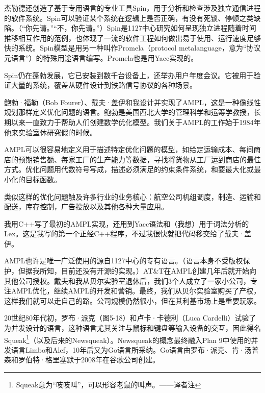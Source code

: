 \documentclass[a4paper,12pt,UTF8,twoside]{ctexbook}
\begin{document}
杰勒德还创造了基于专用语言的专业工具Spin，用于分析和检查涉及独立通信进程的软件系统。Spin可以验证某个系统在逻辑上是否正确，有没有死锁、停顿之类缺陷。（“你先请。”“不，你先请。”）Spin是1127中心研究如何呈现独立进程随着时间推移相互作用的范例，也体现了一流的软件工程如何做出易于使用、运行速度足够快的系统。Spin模型是用另一种叫作Promela（protocol metalanguage，意为“协议元语言”）的特殊用途语言编写。Promela也是用Yacc实现的。

Spin仍在蓬勃发展，它已安装到数千台设备上，还举办用户年度会议。它被用于验证大量的系统，覆盖从硬件设计到铁路信号协议的各种场景。

鲍勃·福勒（Bob Fourer）、戴夫·盖伊和我设计并实现了AMPL，这是一种像线性规划那样定义优化问题的语言。鲍勃是美国西北大学的管理科学和运筹学教授，长期以来一直致力于帮助人们创建数学优化模型。我们关于AMPL的工作始于1984年他来实验室休研究假的时候。

AMPL可以很容易地定义用于描述特定优化问题的模型，如给定运输成本、每间商店的预期销售额、每家工厂的生产能力等数据，寻找将货物从工厂运到商店的最佳方式。优化问题用代数符号写成，描述必须满足的约束条件系统，和要最大化或最小化的目标函数。

类似这样的优化问题触及许多行业的业务核心：航空公司机组调度，制造、运输和配送，库存控制，广告投放以及其他各种大量应用。

我用C++写了最初的AMPL实现，还用到Yacc语法和（我想）用于词法分析的Lex。这是我写的第一个正经C++程序，不过我很快就把代码移交给了戴夫·盖伊。

AMPL也许是唯一广泛使用的源自1127中心的专有语言。（语言本身不受版权保护，但据我所知，目前还没有开源的实现。）AT\&T在AMPL创建几年后就开始向其他公司授权。戴夫和我从贝尔实验室退休后，我们3个人成立了一家小公司，专注AMPL优化，继续AMPL的开发和营销。最终，我们从贝尔实验室购买了产权，这样我们就可以走自己的路。公司规模仍然很小，但在其利基市场上是重要玩家。

20世纪80年代初，罗布·派克（图5-18）和卢卡·卡德利（Luca Cardelli）试验了为并发设计的语言，这种语言尤其关注与鼠标和键盘等输入设备的交互，因此得名Squeak\footnote{Squeak意为“吱吱叫”，可以形容老鼠的叫声。——译者注}（以及后来的Newsqueak）。Newsqueak的概念最终融入Plan 9中使用的并发语言Limbo和Alef，10年后又为Go语言所采纳。Go语言由罗布·派克、肯·汤普森和罗伯特·格里塞默于2008年在谷歌公司创建。
\end{document}
